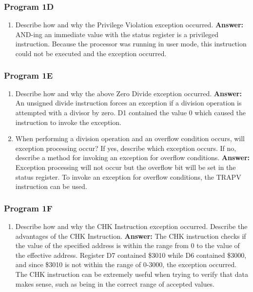 \documentclass[12pt, twocolumn]{article}
\begin{document}
\subsubsection{Program 1D}
\begin{enumerate}
	\item Describe how and why the Privilege Violation exception occurred.
	\subitem \hspace{-0.7cm}\textbf{Answer:} AND-ing an immediate value with the status register is a privileged instruction. Because the processor was running in user mode, this instruction could not be executed and the exception occurred.
\end{enumerate}
\subsubsection{Program 1E}
\begin{enumerate}
	\item Describe how and why the above Zero Divide exception occurred.
	\subitem \hspace{-0.7cm}\textbf{Answer:} An unsigned divide instruction forces an exception if a division operation is attempted with a divisor by zero. D1 contained the value 0 which caused the instruction to invoke the exception.
	\item When performing a division operation and an overflow condition occurs, will exception processing occur? If yes, describe which exception occurs. If no, describe a method for invoking an exception for overflow conditions.
	\subitem \hspace{-0.7cm}\textbf{Answer:} Exception processing will not occur but the overflow bit will be set in the status register. To invoke an exception for overflow conditions, the TRAPV instruction can be used.
\end{enumerate}
\subsubsection{Program 1F}
\begin{enumerate}
	\item Describe how and why the CHK Instruction exception occurred. Describe the advantages of the CHK Instruction.
	\subitem \hspace{-0.7cm}\textbf{Answer:} The CHK instruction checks if the value of the specified address is within the range from 0 to the value of the effective address. Register D7 contained \$3010 while D6 contained \$3000, and since \$3010 is not within the range of 0-3000, the exception occurred. The CHK instruction can be extremely useful when trying to verify that data makes sense, such as being in the correct range of accepted values.
\end{enumerate}
\end{document}
